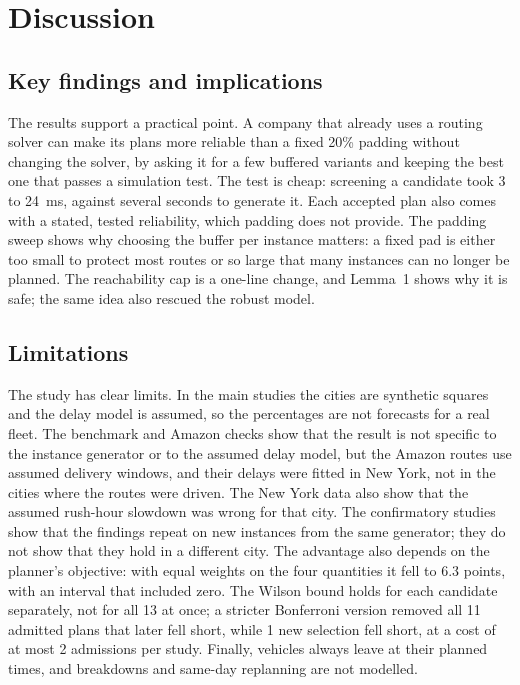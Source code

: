 \documentclass[12pt,letterpaper]{article}
\begin{document}
\section{Discussion}

\subsection{Key findings and implications}

The results support a practical point. A company that already uses a routing solver
can make its plans more reliable than a fixed 20\% padding without changing the
solver, by asking it for a few buffered variants and keeping the best one that
passes a simulation test. The test is cheap: screening a candidate took
3 to 24~ms, against several seconds to
generate it. Each accepted plan also comes with a stated, tested reliability, which
padding does not provide. The padding sweep shows why choosing the buffer per
instance matters: a fixed pad is either too small to protect most routes or so
large that many instances can no longer be planned. The reachability cap is a one-line change, and
Lemma~1 shows why it is safe; the same idea also rescued the robust
model.

\subsection{Limitations}

The study has clear limits. In the main studies the cities are synthetic squares and the
delay model is assumed, so the percentages are not forecasts for a real fleet. The benchmark and Amazon checks show that the result is not specific to the
instance generator or to the assumed delay model, but the Amazon routes use
assumed delivery windows, and their delays were fitted in New York, not in the
cities where the routes were driven. The New York data also show that the assumed
rush-hour slowdown was wrong for that city. The confirmatory studies show that the findings repeat on new
instances from the same generator; they do not show that they hold in a different
city. The advantage also depends on the planner's objective: with equal weights on
the four quantities it fell to 6.3 points, with an interval that
included zero. The Wilson bound holds for each candidate separately, not for all 13
at once; a stricter Bonferroni version removed all 11 admitted plans that
later fell short, while 1 new selection fell short, at a cost of at most
2 admissions per study. Finally, vehicles always leave at their planned
times, and breakdowns and same-day replanning are not modelled.
\end{document}

